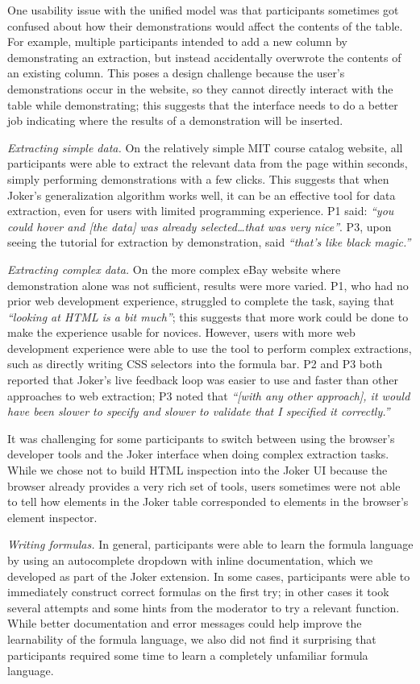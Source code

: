 \documentclass[sigconf,10pt]{acmart}
\begin{document}
One usability issue with the unified model was that participants
sometimes got confused about how their demonstrations would affect the
contents of the table. For example, multiple participants intended to
add a new column by demonstrating an extraction, but instead
accidentally overwrote the contents of an existing column. This poses a
design challenge because the user's demonstrations occur in the website,
so they cannot directly interact with the table while demonstrating;
this suggests that the interface needs to do a better job indicating
where the results of a demonstration will be inserted.

\emph{Extracting simple data.} On the relatively simple MIT course
catalog website, all participants were able to extract the relevant data
from the page within seconds, simply performing demonstrations with a
few clicks. This suggests that when Joker's generalization algorithm
works well, it can be an effective tool for data extraction, even for
users with limited programming experience. P1 said: \emph{``you could
hover and {[}the data{]} was already selected\ldots that was very
nice''}. P3, upon seeing the tutorial for extraction by demonstration,
said \emph{``that's like black magic.''}

\emph{Extracting complex data.} On the more complex eBay website where
demonstration alone was not sufficient, results were more varied. P1,
who had no prior web development experience, struggled to complete the
task, saying that \emph{``looking at HTML is a bit much''}; this
suggests that more work could be done to make the experience usable for
novices. However, users with more web development experience were able
to use the tool to perform complex extractions, such as directly writing
CSS selectors into the formula bar. P2 and P3 both reported that Joker's
live feedback loop was easier to use and faster than other approaches to
web extraction; P3 noted that \emph{``{[}with any other approach{]}, it
would have been slower to specify and slower to validate that I
specified it correctly.''}

It was challenging for some participants to switch between using the
browser's developer tools and the Joker interface when doing complex
extraction tasks. While we chose not to build HTML inspection into the
Joker UI because the browser already provides a very rich set of tools,
users sometimes were not able to tell how elements in the Joker table
corresponded to elements in the browser's element inspector.

\emph{Writing formulas.} In general, participants were able to learn the
formula language by using an autocomplete dropdown with inline
documentation, which we developed as part of the Joker extension. In
some cases, participants were able to immediately construct correct
formulas on the first try; in other cases it took several attempts and
some hints from the moderator to try a relevant function. While better
documentation and error messages could help improve the learnability of
the formula language, we also did not find it surprising that
participants required some time to learn a completely unfamiliar formula
language.
\end{document}

